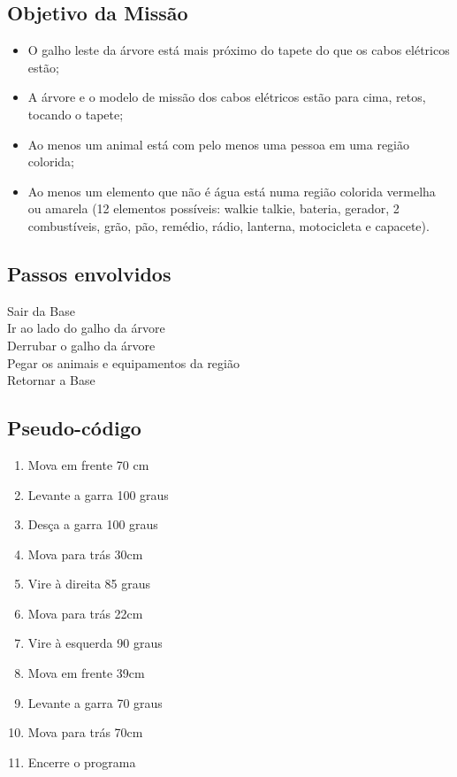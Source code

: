 \documentclass[12pt,a4paper]{article}
\begin{document}
	\subsection{Objetivo da Missão}
		\begin{itemize}
			\item O galho leste da árvore está mais próximo do tapete do que os 
			cabos elétricos estão;
			\item A árvore e o modelo de missão dos cabos elétricos estão para 
			cima, retos, tocando o tapete;
			\item Ao menos um animal está com pelo menos uma pessoa em uma 
			região colorida;
			\item Ao menos um elemento que não é água está numa região colorida 
			vermelha ou amarela (12 elementos possíveis: walkie talkie, bateria, 
			gerador, 2 combustíveis, grão, pão, remédio, rádio, lanterna, 
			motocicleta e capacete).
		\end{itemize}

	\subsection{Passos envolvidos}
		Sair da Base\\
    	Ir ao lado do galho da árvore\\
    	Derrubar o galho da árvore\\
    	Pegar os animais e equipamentos da região\\
   		Retornar a Base\\

   	\subsection{Pseudo-código}
   		\begin{enumerate}
	   		\item Mova em frente 70 cm
	   		\item Levante a garra 100 graus
	   		\item Desça a garra 100 graus
	   		\item Mova para trás 30cm
	   		\item Vire à direita 85 graus
	   		\item Mova para trás 22cm
	   		\item Vire à esquerda 90 graus
	   		\item Mova em frente 39cm
	   		\item Levante a garra 70 graus
	   		\item Mova para trás 70cm
		    \item Encerre o programa
		\end{enumerate}
\end{document}

